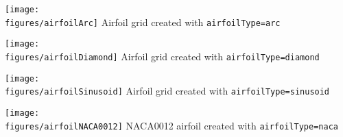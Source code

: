 \noindent
\begin{minipage}{.475\linewidth}
  \begin{center}
   \texttt{[image: \\figures/airfoilArc]}
  {Airfoil grid created with {\tt airfoilType=arc}}
  \end{center}
\end{minipage}\hfill
\begin{minipage}{.475\linewidth}
  \begin{center}
   \texttt{[image: \\figures/airfoilDiamond]}
  {Airfoil grid created with {\tt airfoilType=diamond}}
  \end{center}
\end{minipage}
\noindent
\begin{minipage}{.475\linewidth}
  \begin{center}
   \texttt{[image: \\figures/airfoilSinusoid]}
  {Airfoil grid created with {\tt airfoilType=sinusoid}}
  \end{center}
\end{minipage}\hfill
\begin{minipage}{.475\linewidth}
  \begin{center}
   \texttt{[image: \\figures/airfoilNACA0012]}
  {NACA0012 airfoil created with {\tt airfoilType=naca}}
  \end{center}
\end{minipage}


